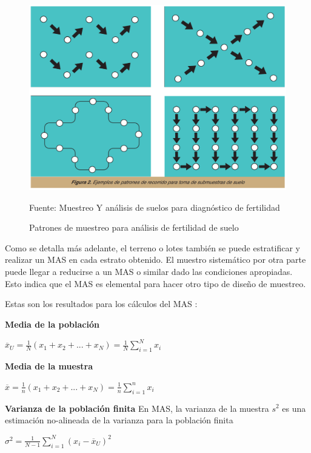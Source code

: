 \documentclass{report}
\begin{document}
\begin{figure}[H]
    \centering
    \includegraphics[width=0.3\paperwidth]{ref/sampling-patterns-srs.png}
    \caption{Patrones de muestreo para análisis de fertilidad de suelo}
    Fuente: Muestreo Y análisis de suelos para diagnóstico de fertilidad \cite{lassaga-2011}
\end{figure}

Como se detalla más adelante, el terreno o lotes también se puede estratificar y realizar un MAS en cada estrato obtenido. El muestro sistemático por otra parte puede llegar a reducirse a un MAS o similar dado las condiciones apropiadas. Esto indica que el MAS es elemental para hacer otro tipo de diseño de muestreo.

\bigbreak

Estas son los resultados para los cálculos del MAS \cite{thompson-2012}:

\bigbreak
\textbf{Media de la población}

\bigbreak

$\overline{x}_U = \frac{1}{N}(x_1 + x_2 + ... + x_N) = \frac{1}{N} \sum_{i=1}^N x_i$


\bigbreak
\textbf{Media de la muestra}

\bigbreak

$\overline{x} = \frac{1}{n}(x_1 + x_2 + ... + x_N) = \frac{1}{n} \sum_{i=1}^n x_i$


\bigbreak
\textbf{Varianza de la población finita} En MAS, la varianza de la muestra $s^2$ es una estimación no-alineada de la varianza para la población finita

\bigbreak

$\sigma ^2 = \frac{1}{N-1} \sum_{i=1}^{N} (x_i - \overline{x}_U)^2$
\end{document}
